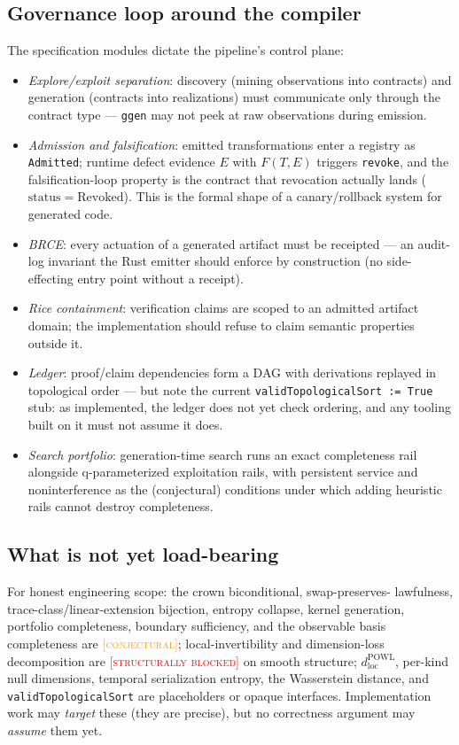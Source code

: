 \documentclass[11pt]{article}
\newcommand{\CONJECTURAL}{\textcolor{orange}{\textsc{[conjectural]}}}
\newcommand{\BLOCKED}{\textcolor{red}{\textsc{[structurally blocked]}}}
\theoremstyle{plain}
\theoremstyle{definition}
\begin{document}
\subsection{Governance loop around the compiler}
The specification modules dictate the pipeline's control plane:
\begin{itemize}[nosep]
  \item \emph{Explore/exploit separation}: discovery (mining observations
  into contracts) and generation (contracts into realizations) must
  communicate only through the contract type --- \texttt{ggen} may not peek
  at raw observations during emission.
  \item \emph{Admission and falsification}: emitted transformations enter a
  registry as \texttt{Admitted}; runtime defect evidence $E$ with
  $F(T,E)$ triggers \texttt{revoke}, and the falsification-loop property is
  the contract that revocation actually lands
  ($\mathrm{status} = \mathrm{Revoked}$). This is the formal shape of a
  canary/rollback system for generated code.
  \item \emph{BRCE}: every actuation of a generated artifact must be
  receipted --- an audit-log invariant the Rust emitter should enforce by
  construction (no side-effecting entry point without a receipt).
  \item \emph{Rice containment}: verification claims are scoped to an
  admitted artifact domain; the implementation should refuse to claim
  semantic properties outside it.
  \item \emph{Ledger}: proof/claim dependencies form a DAG with derivations
  replayed in topological order --- but note the current
  \texttt{validTopologicalSort := True} stub: as implemented, the ledger
  does not yet check ordering, and any tooling built on it must not assume
  it does.
  \item \emph{Search portfolio}: generation-time search runs an exact
  completeness rail alongside q-parameterized exploitation rails, with
  persistent service and noninterference as the (conjectural) conditions
  under which adding heuristic rails cannot destroy completeness.
\end{itemize}

\subsection{What is not yet load-bearing}
For honest engineering scope: the crown biconditional, swap-preserves-
lawfulness, trace-class/linear-extension bijection, entropy collapse, kernel
generation, portfolio completeness, boundary sufficiency, and the observable
basis completeness are \CONJECTURAL; local-invertibility and dimension-loss
decomposition are \BLOCKED{} on smooth structure;
$d^{\mathrm{POWL}}_{\mathrm{loc}}$, per-kind null dimensions, temporal
serialization entropy, the Wasserstein distance, and
\texttt{validTopologicalSort} are placeholders or opaque interfaces.
Implementation work may \emph{target} these (they are precise), but no
correctness argument may \emph{assume} them yet.
\end{document}

